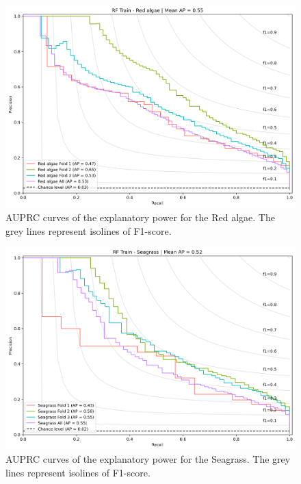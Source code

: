 \begin{figure}
\hypertarget{fig:chap3figS31}{%
\centering
\includegraphics{03-Chapitre3/figures/supplementary/03-precision_recall_curve_train_rf_Red algae.png}
\caption{AUPRC curves of the explanatory power for the Red algae. The
grey lines represent isolines of F1-score.}\label{fig:chap3figS31}
}
\end{figure}

\begin{figure}
\hypertarget{fig:chap3figS32}{%
\centering
\includegraphics{03-Chapitre3/figures/supplementary/03-precision_recall_curve_train_rf_Seagrass.png}
\caption{AUPRC curves of the explanatory power for the Seagrass. The
grey lines represent isolines of F1-score.}\label{fig:chap3figS32}
}
\end{figure}


